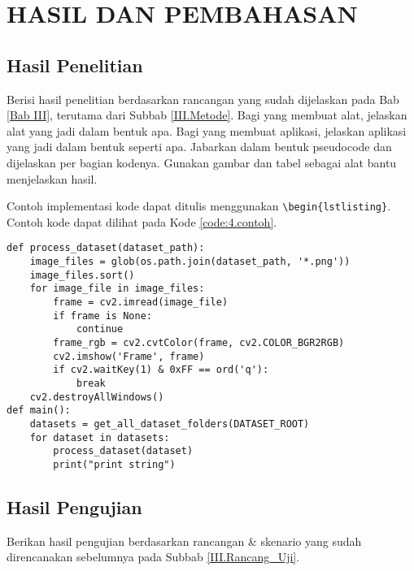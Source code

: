 \newpage
\chapter{HASIL DAN PEMBAHASAN} \label{Bab IV}

\section{Hasil Penelitian} \label{IV.Hasil}
Berisi hasil penelitian berdasarkan rancangan yang sudah dijelaskan pada Bab \ref{Bab III}, terutama dari Subbab \ref{III.Metode}. Bagi yang membuat alat, jelaskan alat yang jadi dalam bentuk apa. Bagi yang membuat aplikasi, jelaskan aplikasi yang jadi dalam bentuk seperti apa. Jabarkan dalam bentuk pseudocode dan dijelaskan per bagian kodenya. Gunakan gambar dan tabel sebagai alat bantu menjelaskan hasil. \par

Contoh implementasi kode dapat ditulis menggunakan \verb|\begin{lstlisting}|. Contoh kode dapat dilihat pada Kode \ref{code:4.contoh}. \par
\begin{lstlisting}[caption={Akuisisi Gambar}, label={code:4.contoh}]
def process_dataset(dataset_path):
	image_files = glob(os.path.join(dataset_path, '*.png'))
	image_files.sort()
	for image_file in image_files:
		frame = cv2.imread(image_file)
		if frame is None:
			continue
		frame_rgb = cv2.cvtColor(frame, cv2.COLOR_BGR2RGB)
		cv2.imshow('Frame', frame)
		if cv2.waitKey(1) & 0xFF == ord('q'):
			break
	cv2.destroyAllWindows()
def main():
	datasets = get_all_dataset_folders(DATASET_ROOT)
	for dataset in datasets:
		process_dataset(dataset)
		print("print string")
\end{lstlisting}

\section{Hasil Pengujian} \label{IV.Hasil_Uji}
Berikan hasil pengujian berdasarkan rancangan \& skenario yang sudah direncanakan sebelumnya pada Subbab \ref{III.Rancang_Uji}. \par

